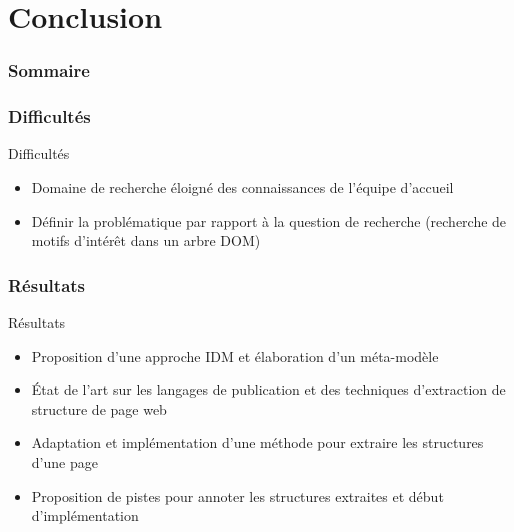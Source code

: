 \documentclass[9pt]{beamer}
\begin{document}
\section{Conclusion}
\begin{frame}
  \frametitle{Sommaire}
\end{frame}
\begin{frame}
	\frametitle{Difficultés}
	\begin{block}{Difficultés}
		\begin{itemize}
			\item Domaine de recherche éloigné des connaissances de l'équipe d'accueil
			\item Définir la problématique par rapport à la question de recherche (recherche de motifs d'intérêt dans un arbre DOM)
		\end{itemize}
	\end{block}
\end{frame}

\begin{frame}
	\frametitle{Résultats}
	\begin{block}{Résultats}
		\begin{itemize}
			\item Proposition d'une approche IDM et élaboration d'un méta-modèle
			\item État de l'art sur les langages de publication et des techniques d'extraction de structure de page web
			\item Adaptation et implémentation d'une méthode pour extraire les structures d'une page
			\item Proposition de pistes pour annoter les structures extraites et début d'implémentation  
		\end{itemize}
	\end{block}
\end{frame}
\end{document}
